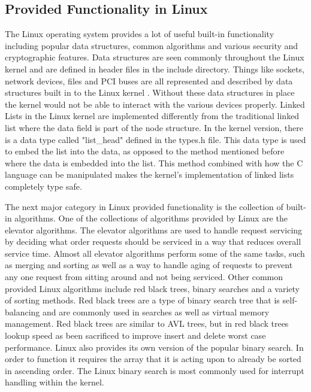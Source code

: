 \documentclass[10pt,serif,draftclsnofoot,onecolumn]{IEEEtran}
\begin{document}
	\subsection{Provided Functionality in Linux}
	\par
			The Linux operating system provides a lot of useful built-in functionality including popular data structures, common algorithms and various security and cryptographic features\cite{8}. Data structures are seen commonly throughout the Linux kernel and are defined in header files in the include directory. Things like sockets, network devices, files and PCI buses are all represented and described by data structures built in to the Linux kernel \cite{7}. Without these data structures in place the kernel would not be able to interact with the various devices properly. Linked Lists in the Linux kernel are implemented differently from the traditional linked list where the data field is part of the node structure. In the kernel version, there is a data type called "list\_head" defined in the types.h file\cite{8}. This data type is used to embed the list into the data, as opposed to the method mentioned before where the data is embedded into the list. This method combined with how the C language can be manipulated makes the kernel's implementation of linked lists completely type safe.
	\newline
	\newline
	\par
			The next major category in Linux provided functionality is the collection of built-in algorithms. One of the collections of algorithms  provided by Linux are the elevator algorithms. The elevator algorithms are used to handle request servicing by deciding what order requests should be serviced in a way that reduces overall service time\cite{8}. Almost all elevator algorithms perform some of the same tasks, such as merging and sorting as well as a way to handle aging of requests to prevent any one request from sitting around and not being serviced\cite{8}. Other common provided Linux algorithms include red black trees, binary searches and a variety of sorting methods. Red black trees are a type of binary search tree that is self-balancing and are commonly used in searches as well as virtual memory management\cite{9}. Red black trees are similar to AVL trees, but in red black trees lookup speed as been sacrificed to improve insert and delete worst case performance\cite{9}. Linux also provides its own version of the popular binary search. In order to function it requires the array that it is acting upon to already be sorted in ascending order. The Linux binary search is most commonly used for interrupt handling within the kernel.
\end{document}
